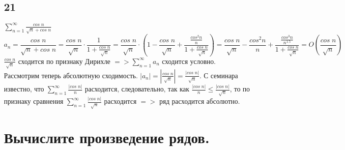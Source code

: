 \documentclass[a4paper,fleqn]{article}
\begin{document}
    \subsection*{21}
    $\displaystyle \sum\limits_{n=1}^{\infty} \frac{cos \; n}{\sqrt{n} + cos \; n}$ \\
    \begin{equation*} a_n = \frac{cos \; n}{\sqrt{n} + cos \; n} = \frac{cos \; n}{\sqrt{n}} \cdot \frac{1}{1+\frac{cos\; n}{\sqrt{n}}} = \frac{cos\; n}{\sqrt{n}} \cdot (1 - \frac{cos\; n}{\sqrt{n}} + \frac{\frac{cos^2n}{n}}{1 + \frac{cos\; n}{\sqrt{n}}}) = \frac{cos\; n}{\sqrt{n}} - \frac{cos^2n}{n} + \frac{\frac{cos^3n}{n^{1.5}}}{1 + \frac{cos\; n}{\sqrt{n}}} = O(\frac{cos \; n}{\sqrt{n}})\end{equation*}
    $\displaystyle \frac{cos \; n}{\sqrt{n}}$ сходится по признаку Дирихле $\displaystyle => \sum\limits_{n=1}^{\infty} a_n$ сходится условно. \\
    Рассмотрим теперь абсолютную сходимость. $\displaystyle |a_n| = \left|\frac{cos \; n}{\sqrt{n}}\right| = \frac{|cos \; n|}{\sqrt{n}}$. С семинара известно, что $\displaystyle \sum\limits_{n = 1}^{\infty} \frac{|cos\; n|}{n}$ расходится, следовательно, так как $\displaystyle \frac{|cos\; n|}{n} \leq \frac{|cos\; n|}{\sqrt{n}}$, то по признаку сравнения $\sum\limits_{n = 1}^{\infty} \frac{|cos\; n|}{\sqrt{n}}$ расходится $\displaystyle =>$ ряд расходится абсолютно. \\


    
    \section*{Вычислите произведение рядов.}

\end{document}
